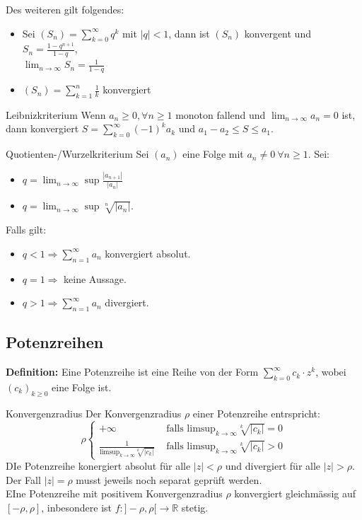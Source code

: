\documentclass[a4paper,8pt]{extarticle}
\newenvironment{definition}{
   \noindent \textbf{Definition:  }}{}
\def\limn{\lim_{n\to \infty}}
\def\R{\mathbb{R}}
\begin{document}
Des weiteren gilt folgendes:
\begin{itemize}
  \item Sei $(S_n) = \sum_{k=0}^\infty q^k$ mit $|q| < 1$, dann ist $(S_n)$ konvergent und $S_n = \frac{1 - q^{n+1}}{1-q}$, \\ $\limn S_n = \frac{1}{1-q}$
  \item $(S_n) = \sum_{k=1}^n \frac{1}{k}$ konvergiert
\end{itemize}

\begin{mainbox}{Leibnizkriterium}
Wenn $a_n \ge 0, \forall n \ge 1$ monoton fallend und $\limn a_n = 0$ ist, dann konvergiert $S = \sum_{k=0}^\infty (-1)^{k} a_k$ und $a_1 - a_2 \le S \le a_1$.
\end{mainbox}

\begin{mainbox}{Quotienten-/Wurzelkriterium}
Sei $(a_n)$ eine Folge mit $a_n \ne 0 \ \forall n \ge 1$. Sei:
\begin{itemize}[nosep]
  \item  $q = \limn \sup \frac{|a_{n+1}|}{|a_n|}$
  \item  $q = \limn \sup \sqrt[n]{|a_n|}$. 
\end{itemize}
Falls gilt:
\begin{itemize}[nosep]
 \item $q < 1 \Rightarrow \sum_{n=1}^\infty a_n$ konvergiert absolut.
 \item $q = 1 \Rightarrow$ keine Aussage.
 \item $q > 1 \Rightarrow \sum_{n=1}^\infty a_n$ divergiert.
\end{itemize}
\end{mainbox}

\subsection{Potenzreihen}
\begin{definition}
  Eine Potenzreihe ist eine Reihe von der Form $\sum_{k = 0}^\infty c_k \cdot z^k$, wobei $(c_k)_{k \geq 0}$ eine Folge ist.
\end{definition}
\begin{mainbox}{Konvergenzradius}
  Der Konvergenzradius $\rho$ einer Potenzreihe entrspricht: $$ \rho \begin{cases}
    + \infty & \text{ falls limsup}_{k \to \infty} \sqrt[k]{|c_k|} = 0\\
    \frac{1}{\text{limsup}_{k \to \infty} \sqrt[k]{|c_k|}} & \text{ falls limsup}_{k \to \infty} \sqrt[k]{|c_k|} > 0
  \end{cases} $$
  DIe Potenzreihe konergiert absolut für alle $|z| < \rho$ und divergiert für alle $|z| > \rho$. Der Fall $|z| = \rho$ musst jeweils noch separat geprüft werden. \\
  EIne Potenzreihe mit positivem Konvergenzradius $\rho$ konvergiert gleichmässig auf $[-\rho, \rho]$, inbesondere ist $f:]-\rho, \rho[\to \R$ stetig.
\end{mainbox}
\end{document}
